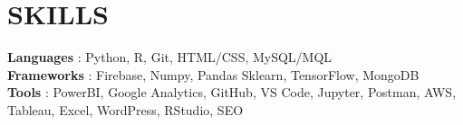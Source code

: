\documentclass[letterpaper,11pt]{article}
\begin{document}
%
\section{SKILLS}
 \begin{itemize}[leftmargin=0in, label={}]
    \small{\item{
     \textbf{Languages} {: Python, R, Git, HTML/CSS, MySQL/MQL}\vspace{2pt} \\
     \textbf{Frameworks}     {: Firebase, Numpy, Pandas Sklearn, TensorFlow, MongoDB} \\
     \textbf{Tools}     {: PowerBI, Google Analytics, GitHub, VS Code, Jupyter, Postman, AWS, Tableau, Excel, WordPress, RStudio, SEO}
     
    }}
 \end{itemize}


\end{document}
